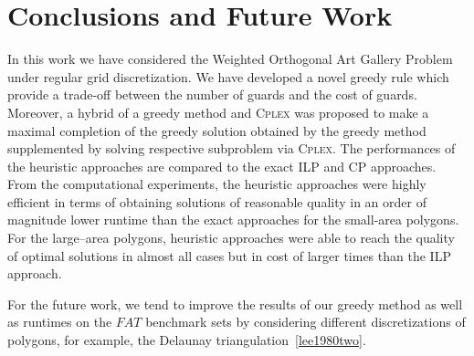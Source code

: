 \documentclass[runningheads,a4paper]{elsarticle}
\begin{document}
	\section{Conclusions and Future Work}
	  In this work we have considered the Weighted Orthogonal Art Gallery Problem under regular grid discretization.
	  We have developed a novel greedy rule which provide a trade-off between the number of guards and the cost of  guards. Moreover, a hybrid of a greedy method and \textsc{Cplex} was proposed to make a maximal completion of the greedy solution obtained by the greedy method supplemented by solving respective subproblem via \textsc{Cplex}. The performances of the heuristic approaches are compared to the exact ILP and CP approaches. From the computational experiments, the heuristic approaches were highly efficient in terms of obtaining solutions of reasonable quality in an order of magnitude lower runtime than the exact approaches for the small-area polygons. For the large--area polygons, heuristic approaches were able to reach the quality of optimal solutions in almost all cases but in cost of larger times than the ILP approach.
	
	  For the future work, we tend to improve the results of our greedy method as well as runtimes on the $FAT$ benchmark sets by considering different discretizations of polygons, for example, the Delaunay triangulation~\ref{lee1980two}.
	
	
	
	
	
	
	
	
	
	
\end{document}
